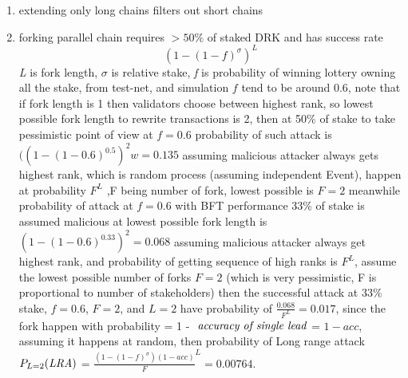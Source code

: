 \documentclass[a4paper]{article}
\begin{document}
\begin{enumerate}
\item extending only long chains filters out short chains
\item forking parallel chain requires $> 50\%$ of staked DRK and has success rate $$ (1-(1-f)^{\sigma})^{L} $$
  \emph{L} is fork length, $\sigma$ is relative stake, \emph{f} is probability of winning lottery owning all the stake, from test-net, and simulation $f$ tend to be around 0.6, note that if fork length is 1 then validators choose between highest rank, so lowest possible fork length to rewrite transactions is 2, then at 50\%  of stake to take pessimistic point of view at $f=0.6$ probability of such attack is $((1-(1-0.6)^{0.5})^2w=0.135$ assuming malicious attacker always gets highest rank, which is random process (assuming independent Event), happen at probability $F^L $ ,F being number of fork, lowest possible is $F=2$ meanwhile probability of attack at $f=0.6$ with BFT performance 33\% of stake is assumed malicious at lowest possible fork length is $(1-(1-0.6)^{0.33})^2=0.068$ assuming malicious attacker always get highest rank, and probability of getting sequence of high ranks is $F^L$, assume the lowest possible number of forks $F=2$ (which is very pessimistic, F is proportional to number of stakeholders) then the successful attack at $33\%$ stake, $f=0.6$, $F=2$, and $L=2$ have probability of $\frac{0.068}{F^L} = 0.017$, since the fork happen with probability = 1 - $\emph{ accuracy of single lead}$ = $1-acc$, assuming it happens at random, then probability of Long range attack $P_{L=2}(\emph{LRA})$ = $\frac{(1-(1-f)^{\sigma})(1-acc)}{F}^L = 0.00764$.


\end{enumerate}
\end{document}
